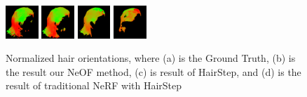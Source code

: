 \documentclass{article}
\begin{document}
\begin{figure}[h]
    {\includegraphics[width=0.11\textwidth]{project-final-paper/images/groundtruth_orientation/output_test_6.png}}
    {\includegraphics[width=0.11\textwidth]{project-final-paper/images/neof/output_test_6.png}}
    {\includegraphics[width=0.11\textwidth]{project-final-paper/images/groundtruth_hairstep/output_test_6.png}}
    {\includegraphics[width=0.11\textwidth]{project-final-paper/images/nerf_hairstep/output_test_6.png}} \\
    
    
    \caption{Normalized hair orientations, where (a) is the Ground Truth, (b) is the result our NeOF method, (c) is result of HairStep, and (d) is the result of traditional NeRF with HairStep}
    \label{fig:result_grid}
\end{figure}
\end{document}
